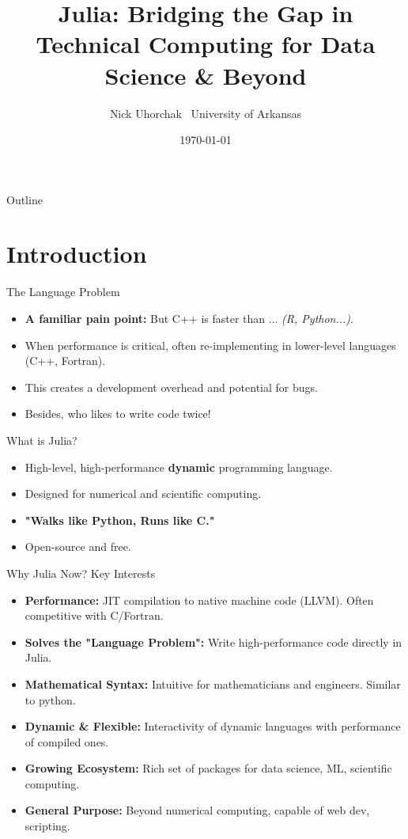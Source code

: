 \documentclass{beamer}
\title[Julia for Data Science]{Julia: Bridging the Gap in Technical Computing for Data Science \& Beyond}
\author[Nick Uhorchak]{Nick Uhorchak \ University of Arkansas}
\date{\today}
\begin{document}
\begin{frame}
    \titlepage
\end{frame}

\begin{frame}{Outline}
    \tableofcontents
\end{frame}

\section{Introduction}

\begin{frame}{The Language Problem}
    \begin{itemize}
        \item \textbf{A familiar pain point:} But C++ is faster than ... \textit{(R, Python...)}.
        \item When performance is critical, often re-implementing in lower-level languages (C++, Fortran).
        \item This creates a development overhead and potential for bugs.
        \item Besides, who likes to write code twice!
    \end{itemize}
\end{frame}

\begin{frame}{What is Julia?}
    \begin{itemize}
        \item High-level, high-performance \textbf{dynamic} programming language.
        \item Designed for numerical and scientific computing.
        \item \textbf{"Walks like Python, Runs like C."}
        \item Open-source and free.
    \end{itemize}
\end{frame}

\begin{frame}{Why Julia Now? Key Interests}
    \begin{itemize}
        \item \textbf{Performance:} JIT compilation to native machine code (LLVM). Often competitive with C/Fortran.
        \item \textbf{Solves the "Language Problem":} Write high-performance code directly in Julia.
        \item \textbf{Mathematical Syntax:} Intuitive for mathematicians and engineers. Similar to python.
        \item \textbf{Dynamic \& Flexible:} Interactivity of dynamic languages with performance of compiled ones.
        \item \textbf{Growing Ecosystem:} Rich set of packages for data science, ML, scientific computing.
        \item \textbf{General Purpose:} Beyond numerical computing, capable of web dev, scripting.
    \end{itemize}
\end{frame}
\end{document}
